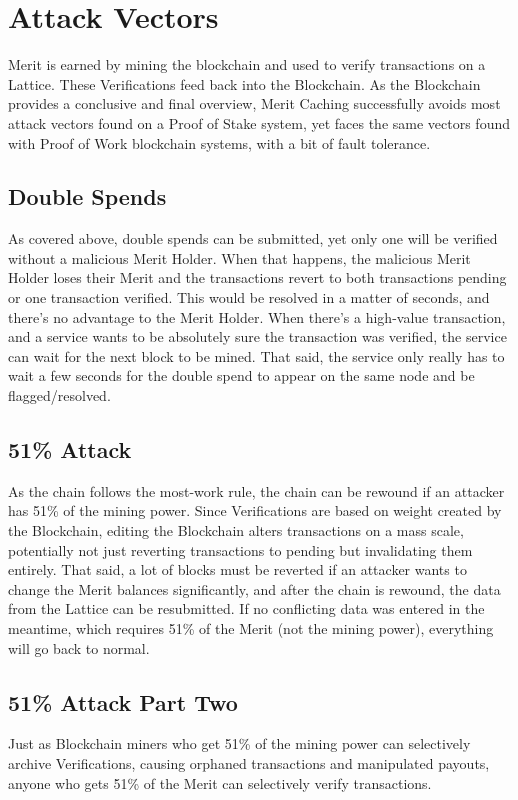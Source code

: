 \documentclass[14pt]{article}
\begin{document}
\newpage

\label{sec:3}
\section{Attack Vectors}
Merit is earned by mining the blockchain and used to verify transactions on a Lattice. These Verifications feed back into the Blockchain. As the Blockchain provides a conclusive and final overview, Merit Caching successfully avoids most attack vectors found on a Proof of Stake system, yet faces the same vectors found with Proof of Work blockchain systems, with a bit of fault tolerance.

\label{sec:3.1}
\subsection{Double Spends}
As covered above, double spends can be submitted, yet only one will be verified without a malicious Merit Holder. When that happens, the malicious Merit Holder loses their Merit and the transactions revert to both transactions pending or one transaction verified. This would be resolved in a matter of seconds, and there's no advantage to the Merit Holder. When there's a high-value transaction, and a service wants to be absolutely sure the transaction was verified, the service can wait for the next block to be mined. That said, the service only really has to wait a few seconds for the double spend to appear on the same node and be flagged/resolved.

\label{sec:3.2}
\subsection{51\% Attack}
As the chain follows the most-work rule, the chain can be rewound if an attacker has 51\% of the mining power. Since Verifications are based on weight created by the Blockchain, editing the Blockchain alters transactions on a mass scale, potentially not just reverting transactions to pending but invalidating them entirely. That said, a lot of blocks must be reverted if an attacker wants to change the Merit balances significantly, and after the chain is rewound, the data from the Lattice can be resubmitted. If no conflicting data was entered in the meantime, which requires 51\% of the Merit (not the mining power), everything will go back to normal.

\label{sec:3.3}
\subsection{51\% Attack Part Two}
Just as Blockchain miners who get 51\% of the mining power can selectively archive Verifications, causing orphaned transactions and manipulated payouts, anyone who gets 51\% of the Merit can selectively verify transactions.
\end{document}
